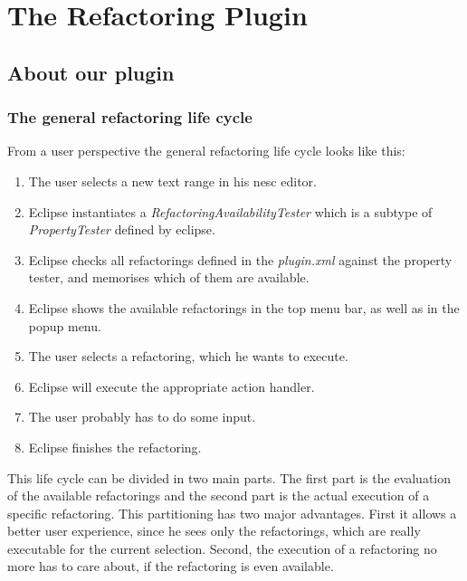\documentclass[a4paper,10pt]{report}
\begin{document}
\part{The Refactoring Plugin}
\chapter{About our plugin}
\section{The general refactoring life cycle}
From a user perspective the general refactoring life cycle looks like this:
   \begin{enumerate}
     \item The user selects a new text range in his nesc editor.
     \item Eclipse instantiates a {\it RefactoringAvailabilityTester} which is a subtype of {\it PropertyTester} defined by eclipse.
     \item Eclipse checks all refactorings defined in the {\it plugin.xml} against the property tester, and memorises which of them are available. 
     \item Eclipse shows the available refactorings in the top menu bar, as well as in the popup menu.
     \item The user selects a refactoring, which he wants to execute.
     \item Eclipse will execute the appropriate action handler.
     \item The user probably has to do some input.
     \item Eclipse finishes the refactoring.
   \end{enumerate}
This life cycle can be divided in two main parts. The first part is the evaluation of the available refactorings and the second part is the actual execution of a specific refactoring. 
This partitioning has two major advantages. First it allows a better user experience, since he sees only the refactorings, which are really executable for the current selection. 
Second, the execution of a refactoring no more has to care about, if the refactoring is even available.
\end{document}
